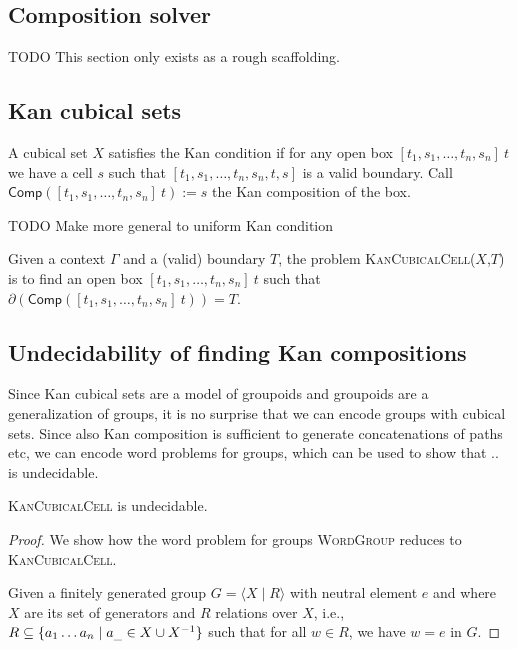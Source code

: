 \documentclass{llncs}
\newcommand{\todo}[1]{
  \begin{tcolorbox}
    TODO {#1} 
  \end{tcolorbox}
}
\newcommand{\mdef}{:=}
\newcommand{\myproblem}[1]{\textsc{{#1}}}
\newcommand{\boundary}[1]{\partial({#1})}
\newcommand{\comp}[2]{\mathsf{Comp}({#1}\ {#2})}
\begin{document}
\begin{proposition}
\section{Composition solver}
\label{sec:compositionsolver}

\todo{This section only exists as a rough scaffolding.}

\subsection{Kan cubical sets}

A cubical set $X$ satisfies the Kan condition if for any open box
$[t_1, s_1, \ldots , t_n , s_n] \ t$ we have a cell $s$ such that $[t_1,
s_1, \ldots , t_n , s_n , t, s]$ is a valid boundary. Call $\comp{[t_1, s_1,
  \ldots , t_n , s_n]}{t} \mdef s$ the Kan composition of the box. 

\todo{Make more general to uniform Kan condition}

\begin{definition}
  Given a context $\Gamma$ and a (valid) boundary $T$, the problem
  \myproblem{KanCubicalCell}($X$,$T$) is to find an open box $[t_1, s_1, \ldots ,
  t_n , s_n] \ t$ such that $\boundary{\comp{[t_1, s_1, \ldots , t_n , s_n]}{t}} = T$.
\end{definition}



\subsection{Undecidability of finding Kan compositions}
\label{ssec:kanundecidable}

Since Kan cubical sets are a model of groupoids and groupoids are a generalization
of groups, it is no surprise that we can encode groups with cubical sets.
Since also Kan composition is sufficient to generate concatenations of paths
etc, we can encode word problems for groups, which can be used to show that ..
is undecidable.
 

\begin{theorem}
  \myproblem{KanCubicalCell} is undecidable.
  \begin{proof} 
    We show how the word problem for groups \myproblem{WordGroup} reduces to
    \myproblem{KanCubicalCell}.

    Given a finitely generated group $G = \langle X \mid R \rangle$ with neutral
    element $e$ and where $X$ are its set of generators and $R$ relations over
    $X$, i.e., $R \subseteq \{ a_1 \mathellipsis a_n \mid a_\_ \in X \cup X^{-1}
    \}$ such that for all $w \in R$, we have $w = e$ in $G$.
    


\end{proof}
\end{theorem}
\end{proposition}
\end{document}
